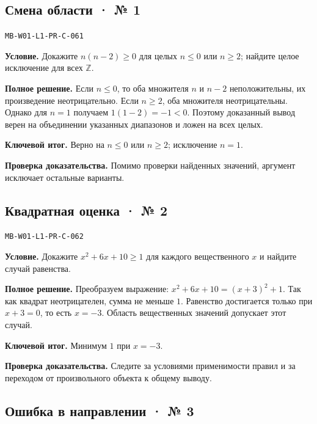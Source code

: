 \documentclass[11pt,a4paper,openany]{book}
\newcommand{\muid}[1]{\texttt{\footnotesize #1}}
\begin{document}
\subsection*{Смена области · № 1}\hypertarget{solution:MB-W01-L1-PR-C-061}{}

\muid{MB-W01-L1-PR-C-061}\par

\textbf{Условие.} Докажите $n(n-2)\ge0$ для целых $n\le0$ или $n\ge2$; найдите целое исключение для всех $\mathbb Z$.\par

\textbf{Полное решение.} Если $n\le0$, то оба множителя $n$ и $n-2$ неположительны, их произведение неотрицательно. Если $n\ge2$, оба множителя неотрицательны. Однако для $n=1$ получаем $1(1-2)=-1<0$. Поэтому доказанный вывод верен на объединении указанных диапазонов и ложен на всех целых.


\begin{learnbox}\textbf{Ключевой итог.} Верно на $n\le0$ или $n\ge2$; исключение $n=1$.\par \textbf{Проверка доказательства.} 
Помимо проверки найденных значений, аргумент исключает остальные варианты. 
\end{learnbox}

\subsection*{Квадратная оценка · № 2}\hypertarget{solution:MB-W01-L1-PR-C-062}{}

\muid{MB-W01-L1-PR-C-062}\par

\textbf{Условие.} Докажите $x^2+6x+10\ge1$ для каждого вещественного $x$ и найдите случай равенства.\par

\textbf{Полное решение.} Преобразуем выражение: $x^2+6x+10=(x+3)^2+1$. Так как квадрат неотрицателен, сумма не меньше $1$. Равенство достигается только при $x+3=0$, то есть $x=-3$. Область вещественных значений допускает этот случай.


\begin{learnbox}\textbf{Ключевой итог.} Минимум $1$ при $x=-3$.\par \textbf{Проверка доказательства.} 
Следите за условиями применимости правил и за переходом от произвольного объекта к общему выводу. 
\end{learnbox}

\subsection*{Ошибка в направлении · № 3}\hypertarget{solution:MB-W01-L1-PR-C-063}{}
\end{document}

